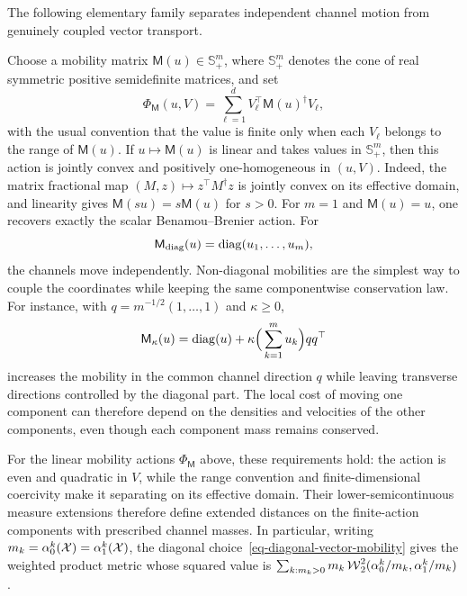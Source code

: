 The following elementary family separates independent channel motion from genuinely coupled vector transport.

\begin{example}
Choose a mobility matrix $\mathsf M(u)\in\mathbb S_+^m$, where $\mathbb S_+^m$ denotes the cone of real symmetric positive semidefinite matrices, and set
\[
	\Phi_{\mathsf M}(u,V)
	=
	\sum_{\ell=1}^d V_{\ell}^{\top}\mathsf M(u)^\dagger V_{\ell},
\]
with the usual convention that the value is finite only when each $V_\ell$ belongs to the range of $\mathsf M(u)$. If $u\mapsto\mathsf M(u)$ is linear and takes values in $\mathbb S_+^m$, then this action is jointly convex and positively one-homogeneous in $(u,V)$. Indeed, the matrix fractional map $(M,z)\mapsto z^\top M^\dagger z$ is jointly convex on its effective domain, and linearity gives $\mathsf M(su)=s\mathsf M(u)$ for $s>0$. For $m=1$ and $\mathsf M(u)=u$, one recovers exactly the scalar Benamou--Brenier action. For
	\begin{equation}\label{eq-diagonal-vector-mobility}
		\mathsf M_{\mathrm{diag}}(u)=\operatorname{diag}(u_1,\ldots,u_m),
	\end{equation}
the channels move independently. Non-diagonal mobilities are the simplest way to couple the coordinates while keeping the same componentwise conservation law. For instance, with $q=m^{-1/2}(1,\ldots,1)$ and $\kappa\geq0$,
\[
	\mathsf M_\kappa(u)=\operatorname{diag}(u)+\kappa\Big(\sum_{k=1}^m u_k\Big) q q^\top
\]
increases the mobility in the common channel direction $q$ while leaving transverse directions controlled by the diagonal part. The local cost of moving one component can therefore depend on the densities and velocities of the other components, even though each component mass remains conserved.
\end{example}

For the linear mobility actions $\Phi_{\mathsf M}$ above, these requirements hold: the action is even and quadratic in $V$, while the range convention and finite-dimensional coercivity make it separating on its effective domain. Their lower-semicontinuous measure extensions therefore define extended distances on the finite-action components with prescribed channel masses. In particular, writing $m_k=\alpha_0^k(\mathcal{X})=\alpha_1^k(\mathcal{X})$, the diagonal choice~\eqref{eq-diagonal-vector-mobility} gives the weighted product metric whose squared value is $\sum_{k:m_k>0}m_k\operatorname{\mathcal{W}}_2^2(\alpha_0^k/m_k,\alpha_1^k/m_k)$.

